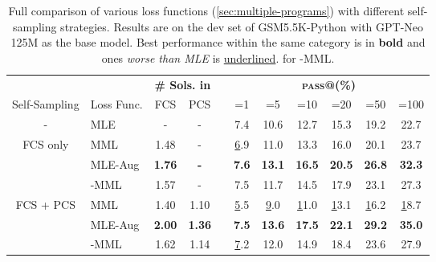  \begin{table}[t]
\small
\begin{tabular}{clcclcccccc}
\toprule
                           &            & \multicolumn{2}{c}{\textbf{\# Sols. in} } &  & \multicolumn{6}{c}{{\textbf{\textsc{pass}@}}\textbf{(\%)}}                                                                   \\ \cline{3-4} \cline{6-11} 
Self-Sampling    & Loss Func. & FCS           & PCS           &  & =1          & =5           & =10          & =20          & =50          & =100         \\\midrule
-            & MLE        & -             & -             &  & 7.4          & 10.6          & 12.7          & 15.3          & 19.2          & 22.7          \\\midrule
\multirow{3}{*}{FCS only}  & MML        & 1.48          & -             &  & {\ul 6.9}    & 11.0          & 13.3          & 16.0          & 20.1          & 23.7          \\
                           & MLE-Aug   & \textbf{1.76} & \textbf{-}    &  & \textbf{7.6} & \textbf{13.1} & \textbf{16.5} & \textbf{20.5} & \textbf{26.8} & \textbf{32.3} \\
                           & -MML  & 1.57          & -             &  & 7.5          & 11.7          & 14.5          & 17.9          & 23.1          & 27.3          \\\midrule
\multirow{3}{*}{FCS + PCS} & MML        & 1.40          & 1.10          &  & {\ul 5.5}    & {\ul 9.0}     & {\ul 11.0}    & {\ul 13.1}    & {\ul 16.2}    & {\ul 18.7}    \\
                           & MLE-Aug   & \textbf{2.00} & \textbf{1.36} &  & \textbf{7.5} & \textbf{13.6} & \textbf{17.5} & \textbf{22.1} & \textbf{29.2} & \textbf{35.0} \\
                           & -MML  & 1.62          & 1.14          &  & {\ul 7.2}    & 12.0          & 14.9          & 18.4          & 23.6          & 27.9         \\\bottomrule
\end{tabular}
\caption{Full comparison of various loss functions (\autoref{sec:multiple-programs}) with different self-sampling strategies. Results are on the dev set of GSM5.5K-Python with GPT-Neo 125M as the base model. Best performance within the same category is in \textbf{bold} and ones \textit{worse than MLE} is \underline{underlined}.  for -MML.}
\label{tab:loss-func-perf}
\end{table} 


